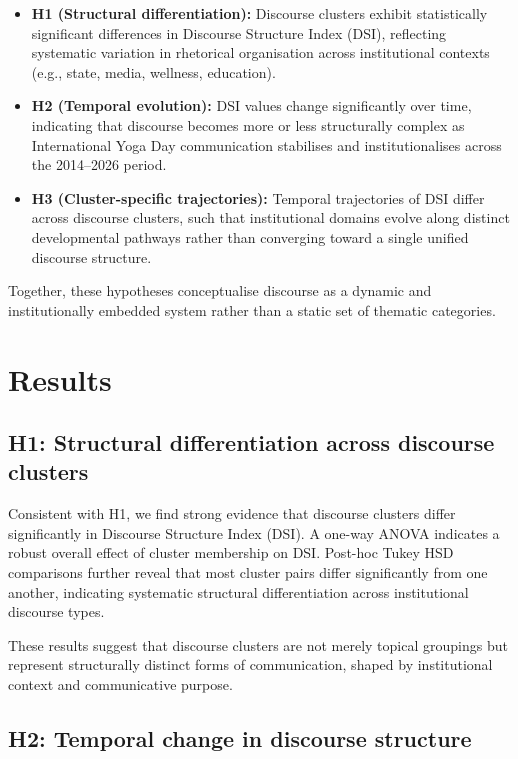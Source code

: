 \documentclass[11pt]{article}
\begin{document}
\begin{itemize}

\item \textbf{H1 (Structural differentiation):} Discourse clusters exhibit statistically significant differences in Discourse Structure Index (DSI), reflecting systematic variation in rhetorical organisation across institutional contexts (e.g., state, media, wellness, education).

\item \textbf{H2 (Temporal evolution):} DSI values change significantly over time, indicating that discourse becomes more or less structurally complex as International Yoga Day communication stabilises and institutionalises across the 2014--2026 period.

\item \textbf{H3 (Cluster-specific trajectories):} Temporal trajectories of DSI differ across discourse clusters, such that institutional domains evolve along distinct developmental pathways rather than converging toward a single unified discourse structure.

\end{itemize}

Together, these hypotheses conceptualise discourse as a dynamic and institutionally embedded system rather than a static set of thematic categories.


\section{Results}

\subsection{H1: Structural differentiation across discourse clusters}

Consistent with H1, we find strong evidence that discourse clusters differ significantly in Discourse Structure Index (DSI). A one-way ANOVA indicates a robust overall effect of cluster membership on DSI. Post-hoc Tukey HSD comparisons further reveal that most cluster pairs differ significantly from one another, indicating systematic structural differentiation across institutional discourse types.

These results suggest that discourse clusters are not merely topical groupings but represent structurally distinct forms of communication, shaped by institutional context and communicative purpose.

\subsection{H2: Temporal change in discourse structure}
\end{document}
